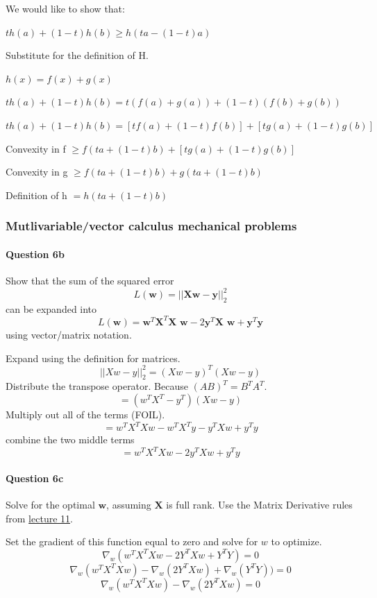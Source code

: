 \documentclass[11pt]{article}
\begin{document}
We would like to show that:

\(th(a) + (1-t)h(b) \geq h(ta - (1-t)a)\)

Substitute for the definition of H.

\(h(x) = f(x) + g(x)\)

\(th(a) + (1-t)h(b) = t(f(a) + g(a)) + (1-t)(f(b) + g(b))\)

\(th(a) + (1-t)h(b) = [tf(a) + (1-t)f(b)] + [tg(a) + (1-t)g(b)]\)

Convexity in f \(\geq f(ta + (1-t)b) + [tg(a) + (1-t)g(b)]\)

Convexity in g \(\geq f(ta + (1-t)b) + g(ta + (1-t)b)\)

Definition of h \(=h(ta + (1-t)b)\)

    \subsubsection{Mutlivariable/vector calculus mechanical
problems}\label{mutlivariablevector-calculus-mechanical-problems}

\paragraph{Question 6b}\label{question-6b}

Show that the sum of the squared error
\[L(\textbf{w}) = ||\textbf{Xw}-\textbf{y}||_2^2\] can be expanded into
\[L(\textbf{w}) = \textbf{w}^T \textbf{X}^T \textbf{X w} - 2 \textbf{y}^T \textbf{X w} + \textbf{y}^T \textbf{y}\]
using vector/matrix notation.

    Expand using the definition for matrices.
\[||Xw - y||^2_2= (Xw - y)^T (Xw - y)\] Distribute the transpose
operator. Because \((AB)^T = B^TA^T\). \[ = (w^T X^T - y^T) (Xw - y)\]
Multiply out all of the terms (FOIL).
\[ = w^T X^T X w - w^T X^T y - y^T X w + y^T y\] combine the two middle
terms \[ = w^T X^T X w - 2y^T X w + y^T y\]

    \paragraph{Question 6c}\label{question-6c}

Solve for the optimal \(\textbf{w}\), assuming \(\textbf{X}\) is full
rank. Use the Matrix Derivative rules from
\href{http://www.ds100.org/fa18/syllabus\#lecture-week-6}{lecture 11}.

    Set the gradient of this function equal to zero and solve for \(w\) to
optimize. \[\nabla_w (w^T X^T X w - 2Y^T X w + Y^T Y) = 0\]
\[\nabla_w (w^T X^T X w) - \nabla_w(2Y^T X w) + \nabla_w(Y^T Y)) = 0\]
\[\nabla_w (w^T X^T X w) - \nabla_w(2Y^T X w) = 0\]
\end{document}
